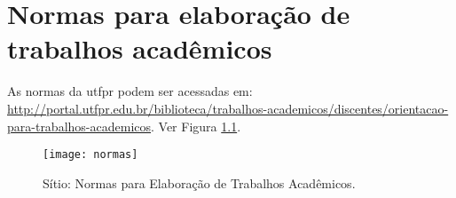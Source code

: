 
\chapter{Normas para elaboração de trabalhos acadêmicos}\label{cap:anexob}

As normas da \gls{utfpr} podem ser acessadas em: \url{http://portal.utfpr.edu.br/biblioteca/trabalhos-academicos/discentes/orientacao-para-trabalhos-academicos}. Ver Figura \ref{fig:capadolivro}.

\begin{figure}[htb]%
\captionsetup{width=0.9\textwidth}%
\caption{Sítio: Normas para Elaboração de Trabalhos Acadêmicos.}%
\label{fig:capadolivro}%
\texttt{[image: normas]}%
\end{figure}

